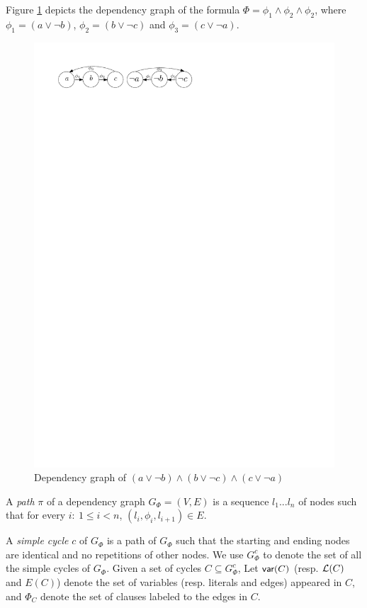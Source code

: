 Figure \ref{fig:depend} depicts the dependency graph of the formula $\Phi=\phi_1\wedge\phi_2\wedge\phi_2$, where
$\phi_1=(a\vee\neg b)$, $\phi_2=(b\vee\neg c)$ and $\phi_3=(c\vee\neg a)$.
 \begin{figure}
    \centering
    \includegraphics[scale=0.7]{dependency.pdf}
   \caption{Dependency graph of $(a\vee\neg b)\wedge(b\vee\neg c)\wedge(c\vee\neg a)$}
   \label{fig:depend}
\end{figure}

A \emph{path} $\pi$ of a dependency graph $G_\Phi=(V,E)$ is a sequence $l_1...l_n$ of nodes such that for every $i:\ 1\leq i<n$, $(l_i,\phi_i,l_{i+1})\in E$.

A \emph{simple cycle} $c$ of $G_\Phi$ is a path of $G_\Phi$ such that the starting and ending nodes are identical and no repetitions of other nodes.
We use $G_\Phi^{c}$ to denote the set of all the simple cycles of $G_\Phi$.
Given a set of cycles $C\subseteq G_\Phi^c$,
Let $\textsf{var}(C)$ (resp. $\Lit(C)$ and $E(C)$) denote the set of variables (resp. literals and edges) appeared in $C$,
and $\Phi_{C}$ denote the set of clauses labeled to the edges in $C$.

